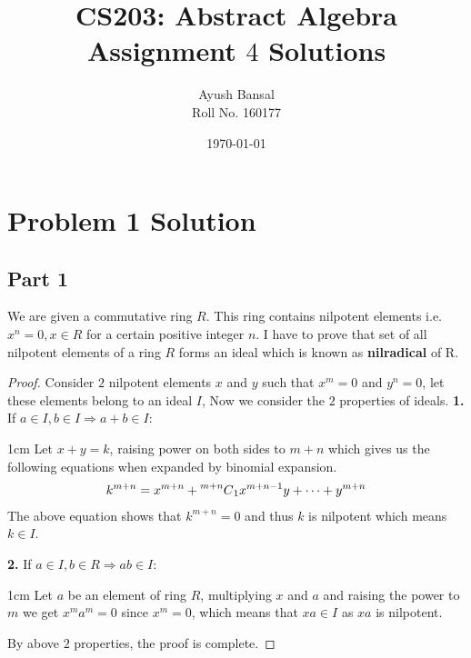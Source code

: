 \documentclass{article}
\title{\vspace{80mm}\lightgreyb CS203: Abstract Algebra \\
\lightgreyb Assignment $4$ Solutions}
\author{Ayush Bansal \\
Roll No. 160177}
\date{\today}
\let\bold\textbf
\newcommand\comb[2][^n]{\prescript{#1\mkern-0.5mu}{}C_{#2}}
\newenvironment{myenv}{\begin{adjustwidth}{1cm}{}}{\end{adjustwidth}}
\begin{document}
\clearpage\maketitle
\thispagestyle{empty}
\newpage
\setcounter{page}{1}
\section{Problem 1 Solution}{
  \subsection{Part 1}{
    We are given a commutative ring $R$. This ring contains nilpotent elements i.e. $x^n=0,x \in R$ for a certain positive integer $n$. \newline
    I have to prove that set of all nilpotent elements of a ring $R$ forms an ideal which is known as \bold{nilradical} of R.
    \begin{proof}
      Consider $2$ nilpotent elements $x$ and $y$ such that $x^m=0$ and $y^n=0$, let these elements belong to an ideal $I$, Now we consider the $2$ properties of ideals. \newline
      \bold{1.} If $a \in I,b \in I \Rightarrow a+b \in I$:
      \begin{myenv}
        Let $x+y=k$, raising power on both sides to $m+n$ which gives us the following equations when expanded by binomial expansion.
        \begin{align*}
          k^{m+n}=x^{m+n}+\comb[m+n]{1}x^{m+n-1}y+\dots+y^{m+n}
        \end{align*}
        The above equation shows that $k^{m+n}=0$ and thus $k$ is nilpotent which means $k \in I$.
      \end{myenv}
      \bold{2.} If $a \in I,b \in R \Rightarrow ab \in I$:
      \begin{myenv}
        Let $a$ be an element of ring $R$, multiplying $x$ and $a$ and raising the power to $m$ we get $x^ma^m=0$ since $x^m=0$, which means that $xa \in I$ as $xa$ is nilpotent.
      \end{myenv}
      By above $2$ properties, the proof is complete.
    \end{proof}
  } 
}
\end{document}
